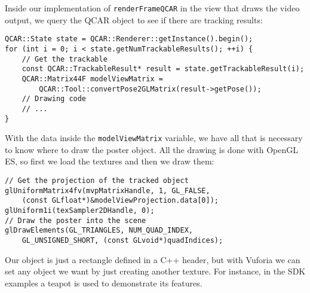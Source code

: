 Inside our implementation of \texttt{renderFrameQCAR} in the view that draws
the video output, we query the QCAR object to see if there are tracking
results: 

\begin{verbatim}
QCAR::State state = QCAR::Renderer::getInstance().begin();
for (int i = 0; i < state.getNumTrackableResults(); ++i) {
    // Get the trackable
    const QCAR::TrackableResult* result = state.getTrackableResult(i);
    QCAR::Matrix44F modelViewMatrix = 
        QCAR::Tool::convertPose2GLMatrix(result->getPose());
    // Drawing code
    // ...
}
\end{verbatim}

With the data inside the \texttt{modelViewMatrix} variable, we have all that is
necessary to know where to draw the poster object. All the drawing is done with
OpenGL ES, so first we load the textures and then we draw them:

\begin{verbatim}
// Get the projection of the tracked object
glUniformMatrix4fv(mvpMatrixHandle, 1, GL_FALSE, 
    (const GLfloat*)&modelViewProjection.data[0]);
glUniform1i(texSampler2DHandle, 0);
// Draw the poster into the scene
glDrawElements(GL_TRIANGLES, NUM_QUAD_INDEX,
    GL_UNSIGNED_SHORT, (const GLvoid*)quadIndices);
\end{verbatim}

Our object is just a rectangle defined in a C++ header, but with Vuforia we can
set any object we want by just creating another texture. For instance, in the
SDK examples a teapot is used to demonstrate its features.

